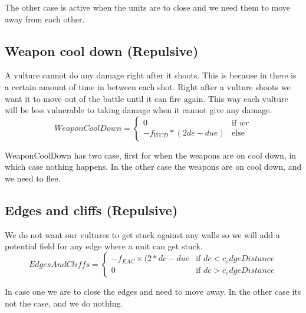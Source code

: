 	The other case is active when the units are to close and we need them to move away from each other.
	
	\subsection*{Weapon cool down (Repulsive)}
A vulture cannot do any damage right after it shoots. This is because in there is a certain amount of time in between each shot. Right after a vulture shoots we want it to move out of the battle until it can fire again. This way each vulture will be less vulnerable to taking damage when it cannot give any damage.
		\begin{displaymath}
			WeaponCoolDown = \begin{cases}
					0 & \text{if } wr\\
					-f_{WCD} * (2de - due) & \text{else}
				\end{cases}		
		\end{displaymath}

    WeaponCoolDown has two case, first for when the weapons are on cool down, in which case nothing happens. In the other case the weapons are on cool down, and we need to flee.        
    
	\subsection*{Edges and cliffs (Repulsive)}
		We do not want our vultures to get stuck against any walls so we will add a potential field for any edge where a unit can get stuck.
		\begin{displaymath}
			EdgesAndCliffs = \begin{cases}
					-f_{EAC} \times {(2*dc - due} & \text{if } dc < c_edgeDistance\\
					0 & \text{if } dc > c_edgeDistance
				\end{cases}		
		\end{displaymath}

    In case one we are to close the edges and need to move away. In the other case its not the case, and we do nothing.   

